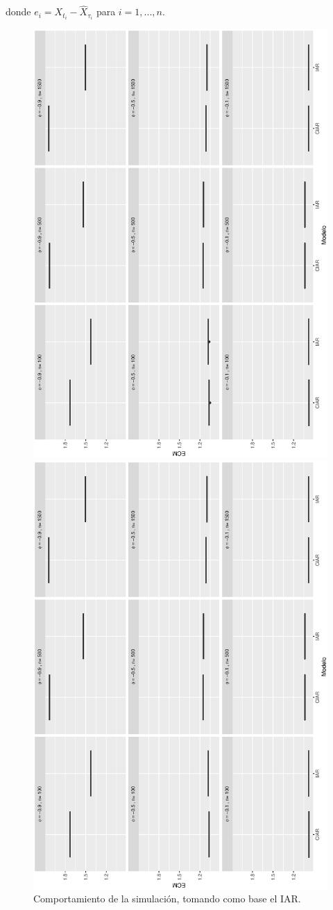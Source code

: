 donde $e_i = X_{t_i} - \hat{X}_{\tau_i}$ para $i = 1, ..., n$.
\begin{figure}[h]
    \begin{minipage}{0.45\textwidth}
    \includegraphics[width=0.75\linewidth,angle = 270]{Kap3/Fig_Cap3/sim4_IARvsCIAR.eps}
    \caption{Comportamiento de la simulación, tomando como base el IAR.}
    \label{fig:iarvsciar}
    \end{minipage}
    \hfill
    \begin{minipage}{0.45\textwidth}
    \includegraphics[width=0.75\linewidth,angle = 270]{Kap3/Fig_Cap3/sim4_CIARvsIAR.eps}

\end{minipage}
\end{figure}
